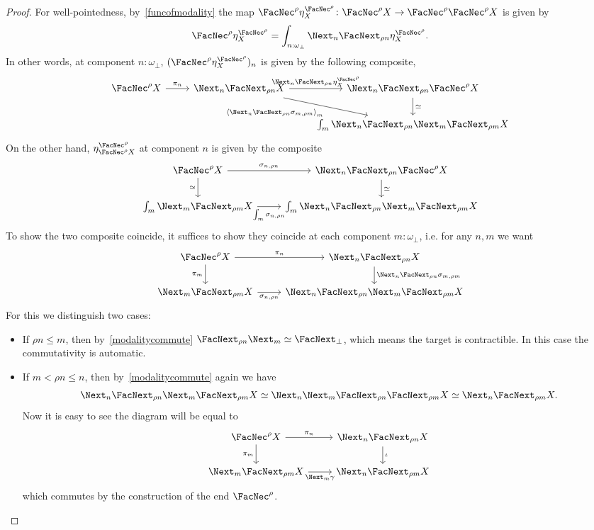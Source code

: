 \documentclass[a4paper,10pt]{amsart}
\theoremstyle{definition}
\newcommand{\pair}[1]{\left\langle#1\right\rangle}
\newcommand{\ovob}{\omega_\bot}
\newcommand{\bx}{\FacNec}
\newcommand{\opm}[1]{\FacNext_{#1}}
\newcommand{\clm}[1]{\Next_{#1}}
\begin{document}
\begin{proof}
  For well-pointedness, by~\cref{funcofmodality} the map $\bx^\rho\eta^{\bx^\rho}_X \colon \bx^\rho X \to \bx^\rho\bx^\rho X$ is given by 
  \[ \bx^\rho\eta^{\bx^\rho}_X = \int_{n:\ovob}\clm n\opm{\rho n}\eta^{\bx^\rho}_X. \]
  In other words, at component $n:\ovob$, $(\bx^\rho\eta^{\bx^\rho}_X)_n$ is given by the following composite,
  \[ 
  \begin{tikzcd}
    \bx^\rho X \ar[r, "\pi_n"] & \clm n\opm{\rho n}X \ar[r, "\clm n\opm{\rho n}\eta^{\bx^\rho}_X"] \ar[dr, "\pair{\clm n\opm{\rho n}\sigma_{m,\rho m}}_{m}"'] & \clm n\opm{\rho n}\bx^\rho X \ar[d, "\simeq"] \\
    & & \int_{m}\clm n\opm{\rho n}\clm m\opm{\rho m}X
  \end{tikzcd}
  \]
  On the other hand, $\eta^{\bx^\rho}_{\bx^\rho X}$ at component $n$ is given by the composite
  \[
  \begin{tikzcd}
    \bx^\rho X \ar[r, "\sigma_{n,\rho n}"] \ar[d, "\simeq"'] & \clm n\opm{\rho n}\bx^\rho X \ar[d, "\simeq"] \\ 
    \int_{m}\clm m\opm{\rho m}X \ar[r, "\int_{m}\sigma_{n,\rho n}"'] & \int_{m}\clm n\opm{\rho n}\clm m\opm{\rho m}X
  \end{tikzcd}
  \]
  To show the two composite coincide, it suffices to show they coincide at each component $m:\ovob$, i.e. for any $n,m$ we want 
  \[
  \begin{tikzcd}
    \bx^\rho X \ar[d, "\pi_m"'] \ar[r, "\pi_n"] & \clm n\opm{\rho n}X \ar[d, "\clm n\opm{\rho n}\sigma_{m,\rho m}"] \\
    \clm m\opm{\rho m}X \ar[r, "\sigma_{n,\rho n}"'] & \clm n\opm{\rho n}\clm m\opm{\rho m}X
  \end{tikzcd}
  \]
  For this we distinguish two cases:
  \begin{itemize}
    \item If $\rho n \le m$, then by~\cref{modalitycommute} $\opm{\rho n}\clm m \simeq \opm{\bot}$, which means the target is contractible. In this case the commutativity is automatic.
    \item If $m < \rho n \le n$, then by~\cref{modalitycommute} again we have
    \[ \clm n\opm{\rho n}\clm m\opm{\rho m}X \simeq \clm n\clm m\opm{\rho n}\opm{\rho m}X \simeq \clm n\opm{\rho m}X. \]
    Now it is easy to see the diagram will be equal to 
    \[
    \begin{tikzcd}
      \bx^\rho X \ar[d, "\pi_m"'] \ar[r, "\pi_n"] & \clm n\opm{\rho n}X \ar[d, "\iota"] \\
      \clm m\opm{\rho m}X \ar[r, "\clm m\gamma"'] & \clm n\opm{\rho m}X
    \end{tikzcd}
    \]
    which commutes by the construction of the end $\bx^\rho$. \qedhere
  \end{itemize}
\end{proof}
\end{document}
